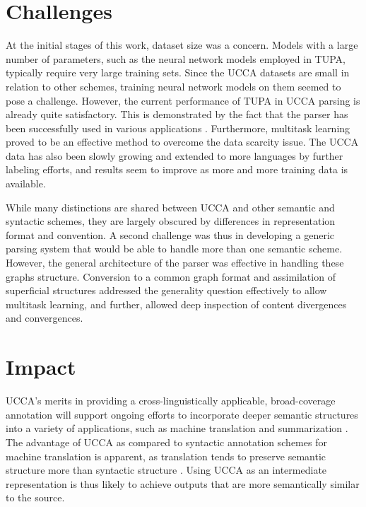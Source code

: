 \documentclass[12pt,a4paper,table]{report}
\renewcommand\cite{\citep}      %
\begin{document}
\section*{Challenges}

At the initial stages of this work, dataset size was a concern.
Models with a large number of parameters,
such as the neural network models employed in TUPA,
typically require very large training sets.
Since the UCCA datasets are small in relation to other schemes,
training neural network models on them seemed to pose a challenge.
However,
the current performance of TUPA in UCCA parsing is already quite satisfactory.
This is demonstrated by the fact that the parser has been successfully used in
various applications \cite{choshen2018reference,sulem2018semantic,sulem2018simple}.
Furthermore,
multitask learning proved to be an effective method to overcome the data scarcity issue.
The UCCA data has also been slowly growing and extended to more languages by further labeling efforts,
and results seem to improve as more and more training data is available.

While many distinctions are shared between UCCA and other semantic and syntactic schemes,
they are largely obscured by differences in representation format and convention.
A second challenge was thus in developing a generic parsing system that would be able
to handle more than one semantic scheme.
However, the general architecture of the parser was effective in handling these
graphs structure.
Conversion to a common graph format and assimilation of superficial structures
addressed the generality question effectively to allow multitask learning,
and further, allowed deep inspection of content divergences and convergences.

\section*{Impact}

UCCA's merits in providing a cross-linguistically applicable,
broad-coverage annotation will support ongoing efforts to incorporate deeper
semantic structures into a variety of applications, such as machine translation
\citep{jones2012semantics} and summarization \citep{liu2015toward}.
The advantage of UCCA as compared to syntactic annotation schemes for machine translation is apparent,
as translation tends to preserve semantic structure more than syntactic structure \citep{sulem2015conceptual}.
Using UCCA as an intermediate representation is thus likely to achieve outputs that are more
semantically similar to the source.
\end{document}
